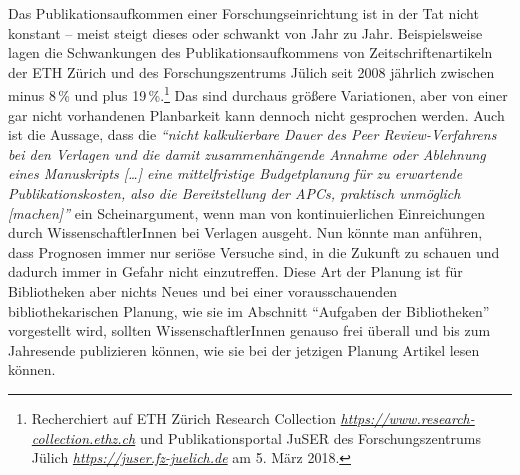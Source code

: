 \documentclass[a4paper,
fontsize=11pt,
oneside,
numbers=noperiodatend,
parskip=half-,
bibliography=totoc,
final
]{scrartcl}
\begin{document}
Das Publikationsaufkommen einer Forschungseinrichtung ist in der Tat
nicht konstant -- meist steigt dieses oder schwankt von Jahr zu Jahr.
Beispielsweise lagen die Schwankungen des Publikationsaufkommens von
Zeitschriftenartikeln der ETH Zürich und des Forschungszentrums Jülich
seit 2008 jährlich zwischen minus 8\,\% und plus 19\,\%.\footnote{Recherchiert
  auf ETH Zürich Research Collection
  \href{https://www.research-collection.ethz.ch}{\emph{https://www.research-collection.ethz.ch}}
  und Publikationsportal JuSER des Forschungszentrums Jülich
  \href{https://juser.fz-juelich.de}{\emph{https://juser.fz-juelich.de}}
  am 5. März 2018.} Das sind durchaus größere Variationen, aber von
einer gar nicht vorhandenen Planbarkeit kann dennoch nicht gesprochen
werden. Auch ist die Aussage, dass die \emph{\enquote{nicht
kalkulierbare Dauer des Peer Review-Verfahrens bei den Verlagen und die
damit zusammenhängende Annahme oder Ablehnung eines Manuskripts
{[}\ldots{}{]} eine mittelfristige Budgetplanung für zu erwartende
Publikationskosten, also die Bereitstellung der APCs, praktisch
unmöglich {[}machen{]}}} ein Scheinargument, wenn man von
kontinuierlichen Einreichungen durch WissenschaftlerInnen bei Verlagen
ausgeht. Nun könnte man anführen, dass Prognosen immer nur seriöse
Versuche sind, in die Zukunft zu schauen und dadurch immer in Gefahr
nicht einzutreffen. Diese Art der Planung ist für Bibliotheken aber
nichts Neues und bei einer vorausschauenden bibliothekarischen Planung,
wie sie im Abschnitt \enquote{Aufgaben der Bibliotheken} vorgestellt
wird, sollten WissenschaftlerInnen genauso frei überall und bis zum
Jahresende publizieren können, wie sie bei der jetzigen Planung Artikel
lesen können.
\end{document}
